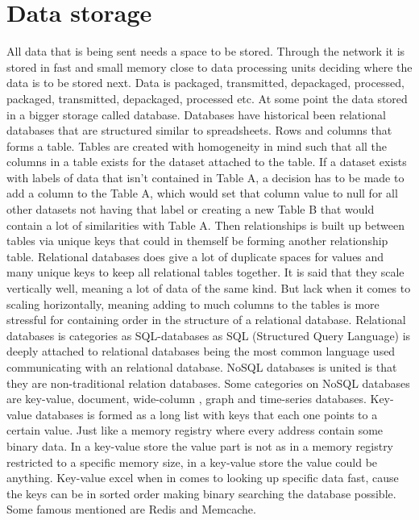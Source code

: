 \documentclass[article,a4paper]{IEEEtran}
\begin{document}
\section{Data storage}
All data that is being sent needs a space to be stored. Through the network it is stored in fast and small memory close to data processing units deciding where the data is to be stored next. Data is packaged, transmitted, depackaged, processed, packaged, transmitted, depackaged, processed etc. At some point the data stored in a bigger storage called database. Databases have historical been relational databases that are structured similar to spreadsheets. Rows and columns that forms a table. Tables are created with homogeneity in mind such that all the columns in a table exists for the dataset attached to the table. If a dataset exists with labels of data that isn't contained in Table A, a decision has to be made to add a column to the Table A, which would set that column value to null for all other datasets not having that label or creating a new Table B that would contain a lot of similarities with Table A.  
\newline 
Then relationships is built up between tables via unique keys that could in themself be forming another relationship table. Relational databases does give a lot of duplicate spaces for values and many unique keys to keep all relational tables together. It is said that they scale vertically well, meaning a lot of data of the same kind. But lack when it comes to scaling horizontally, meaning adding to much columns to the tables is more stressful for containing order in the structure of a relational database. Relational databases is categories as SQL-databases as SQL (Structured Query Language) is deeply attached to relational databases being the most common language used communicating with an relational database. NoSQL databases is united is that they are non-traditional relation databases. Some categories on NoSQL databases are key-value, document, wide-column \cite{Databasesurvey}, graph and time-series databases.      
\newline\newline
Key-value databases is formed as a long list with keys that each one points to a certain value. Just like a memory registry where every address contain some binary data. In a key-value store the value part is not as in a memory registry restricted to a specific memory size, in a key-value store the value could be anything. Key-value excel when in comes to looking up specific data fast, cause the keys can be in sorted order making binary searching the database possible. Some famous mentioned are Redis and Memcache. 
\end{document}
